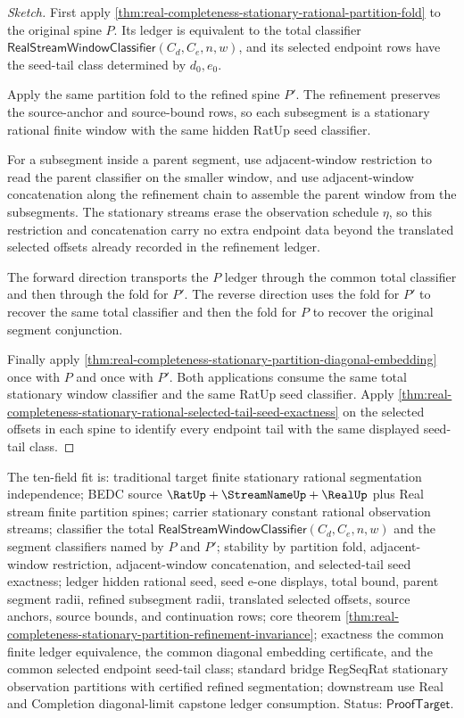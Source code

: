 \begin{proof}[Sketch]
First apply
\autoref{thm:real-completeness-stationary-rational-partition-fold} to the
original spine $P$. Its ledger is equivalent to the total classifier
$\mathsf{RealStreamWindowClassifier}(C_d,C_e,n,w)$, and its selected endpoint
rows have the seed-tail class determined by $d_0,e_0$.

Apply the same partition fold to the refined spine $P'$. The refinement
preserves the source-anchor and source-bound rows, so each subsegment is a
stationary rational finite window with the same hidden RatUp seed classifier.

For a subsegment inside a parent segment, use adjacent-window restriction to
read the parent classifier on the smaller window, and use adjacent-window
concatenation along the refinement chain to assemble the parent window from
the subsegments. The stationary streams erase the observation schedule
$\eta$, so this restriction and concatenation carry no extra endpoint data
beyond the translated selected offsets already recorded in the refinement
ledger.

The forward direction transports the $P$ ledger through the common total
classifier and then through the fold for $P'$. The reverse direction uses the
fold for $P'$ to recover the same total classifier and then the fold for $P$ to
recover the original segment conjunction.

Finally apply
\autoref{thm:real-completeness-stationary-partition-diagonal-embedding} once
with $P$ and once with $P'$. Both applications consume the same total
stationary window classifier and the same RatUp seed classifier. Apply
\autoref{thm:real-completeness-stationary-rational-selected-tail-seed-exactness}
on the selected offsets in each spine to identify every endpoint tail with the
same displayed seed-tail class.
\end{proof}

The ten-field fit is: traditional target finite stationary rational
segmentation independence; BEDC source $\RatUp+\StreamNameUp+\RealUp$ plus Real
stream finite partition spines; carrier stationary constant rational
observation streams; classifier the total
$\mathsf{RealStreamWindowClassifier}(C_d,C_e,n,w)$ and the segment classifiers
named by $P$ and $P'$; stability by partition fold, adjacent-window
restriction, adjacent-window concatenation, and selected-tail seed exactness;
ledger hidden rational seed, seed e-one displays, total bound, parent segment
radii, refined subsegment radii, translated selected offsets, source anchors,
source bounds, and continuation rows; core theorem
\autoref{thm:real-completeness-stationary-partition-refinement-invariance};
exactness the common finite ledger equivalence, the common diagonal embedding
certificate, and the common selected endpoint seed-tail class; standard bridge
RegSeqRat stationary observation partitions with certified refined
segmentation; downstream use Real and Completion diagonal-limit capstone
ledger consumption. Status: $\mathsf{ProofTarget}$.

